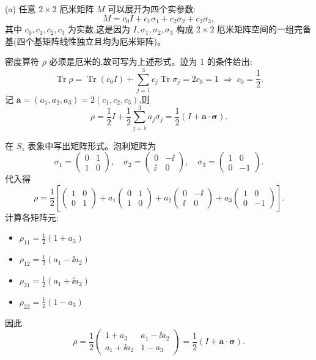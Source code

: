 \begin{solution}
(a) 任意 $2\times2$ 厄米矩阵 $M$ 可以展开为四个实参数:
\[
M = c_0 I + c_1\sigma_1 + c_2\sigma_2 + c_3\sigma_3,
\]
其中 $c_0,c_1,c_2,c_3$ 为实数,这是因为 $I,\sigma_1,\sigma_2,\sigma_3$ 构成 $2\times2$ 厄米矩阵空间的一组完备基(四个基矩阵线性独立且均为厄米矩阵)。

密度算符 $\rho$ 必须是厄米的,故可写为上述形式。迹为 1 的条件给出:
\[
\operatorname{Tr}\rho = \operatorname{Tr}(c_0 I) + \sum_{j=1}^3 c_j\operatorname{Tr}\sigma_j = 2c_0 = 1 \;\Longrightarrow\; c_0 = \frac12.
\]
记 $\mathbf a = (a_1,a_2,a_3) = 2(c_1,c_2,c_3)$,则
\[
\rho = \frac12 I + \frac12\sum_{j=1}^3 a_j\sigma_j = \frac12(I + \mathbf a\cdot\boldsymbol\sigma).
\]

在 $S_z$ 表象中写出矩阵形式。泡利矩阵为
\[
\sigma_1 = \begin{pmatrix}0&1\\1&0\end{pmatrix},\quad
\sigma_2 = \begin{pmatrix}0&-\ii\\\ii&0\end{pmatrix},\quad
\sigma_3 = \begin{pmatrix}1&0\\0&-1\end{pmatrix}.
\]
代入得
\[
\rho = \frac12\left[
\begin{pmatrix}1&0\\0&1\end{pmatrix}
+ a_1\begin{pmatrix}0&1\\1&0\end{pmatrix}
+ a_2\begin{pmatrix}0&-\ii\\\ii&0\end{pmatrix}
+ a_3\begin{pmatrix}1&0\\0&-1\end{pmatrix}
\right].
\]
计算各矩阵元:
\begin{itemize}
\item $\rho_{11} = \frac12(1 + a_3)$
\item $\rho_{12} = \frac12(a_1 - \ii a_2)$
\item $\rho_{21} = \frac12(a_1 + \ii a_2)$
\item $\rho_{22} = \frac12(1 - a_3)$
\end{itemize}
因此
\[
\boxed{\rho = \frac12\begin{pmatrix}
1+a_3 & a_1-\ii a_2\\
a_1+\ii a_2 & 1-a_3
\end{pmatrix}
= \frac12(I+\mathbf a\cdot\boldsymbol\sigma).}
\]


\end{solution}
